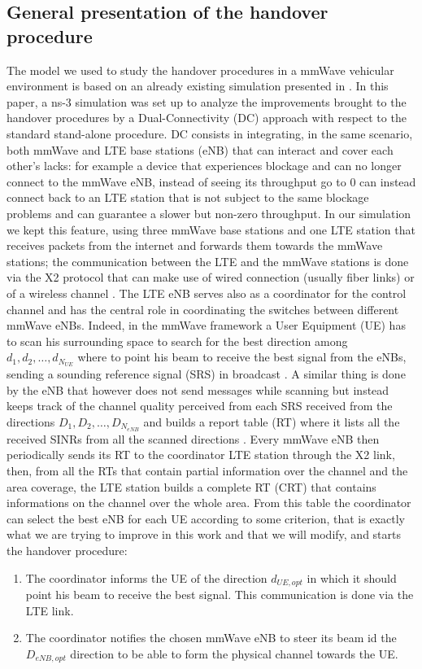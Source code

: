 \documentclass[conference,10pt]{IEEEtran}
\begin{document}
\subsection{General presentation of the handover procedure}\label{sec:symohand}
The model we used to study the handover procedures in a mmWave vehicular environment is based on an already existing simulation presented in \cite{e2esim}. In this paper, a ns-3 simulation was set up to analyze the improvements brought to the handover procedures by a Dual-Connectivity (DC) approach with respect to the standard stand-alone procedure. DC consists in integrating, in the same scenario, both mmWave and LTE base stations (eNB) that can interact and cover each other's lacks: for example a device that experiences blockage and can no longer connect to the mmWave eNB, instead of seeing its throughput go to 0 can instead connect back to an LTE station that is not subject to the same blockage problems and can guarantee a slower but non-zero throughput. In our simulation we kept this feature, using three mmWave base stations and one LTE station that receives packets from the internet and forwards them towards the mmWave stations; the communication between the LTE and the mmWave stations is done via the X2 protocol that can make use of wired connection (usually fiber links) or of a wireless channel \cite{e2esim}. The LTE eNB serves also as a coordinator for the control channel and has the central role in coordinating the switches between different mmWave eNBs. Indeed, in the mmWave framework a User Equipment (UE) has to scan his surrounding space to search for the best direction among $d_1, d_2, \dots , d_{N_{UE}}$ where to point his beam to receive the best signal from the eNBs, sending a sounding reference signal (SRS) in broadcast \cite{imphand}. A similar thing is done by the eNB that however does not send messages while scanning but instead keeps track of the channel quality perceived from each SRS received from the directions $D_1, D_2, \dots , D_{N_{eNB}}$ and builds a report table (RT) where it lists all the received SINRs from all the scanned directions \cite{imphand}. Every mmWave eNB then periodically sends its RT to the coordinator LTE station through the X2 link, then, from all the RTs that contain partial information over the channel and the area coverage, the LTE station builds a complete RT (CRT) that contains informations on the channel over the whole area. From this table the coordinator can select the best eNB for each UE according to some criterion, that is exactly what we are trying to improve in this work and that we will modify, and starts the handover procedure:
\begin{enumerate}
	\item The coordinator informs the UE of the direction $d_{UE,opt}$ in which it should point his beam to receive the best signal. This communication is done via the LTE link.
	\item The coordinator notifies the chosen mmWave eNB to steer its beam id the $D_{eNB,opt}$ direction to be able to form the physical channel towards the UE.
\end{enumerate}   
\end{document}
